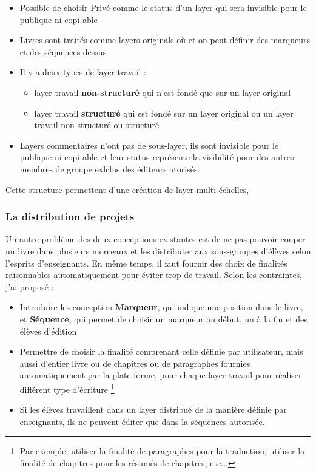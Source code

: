 \begin{itemize}
    \item Possible de choisir Privé comme le status d'un layer qui sera invisible pour le publique ni copi-able
    \item Livres sont traités comme layers originals où et on peut définir des marqueurs et des séquences dessus
    \item Il y a deux types de layer travail :
        \begin{itemize}
            \item layer travail \textbf{non-structuré} qui n'est fondé que sur un layer original
            \item layer travail \textbf{structuré} qui est fondé sur un layer original ou un layer travail non-structuré ou structuré
        \end{itemize}
    \item Layers commentaires n'ont pas de sous-layer, ils sont invisible pour le publique ni copi-able et leur status représente la visibilité pour des autres membres de groupe exlclus des éditeurs atorisés.
\end{itemize}

Cette structure permettent d'une création de layer multi-échelles,

\subsubsection{La distribution de projets}
Un autre problème des deux conceptions existantes est de ne pas pouvoir couper un livre dans plusieurs morceaux et les distributer aux sous-groupes d'élèves selon l'esprits d'enseignants. En même temps, il faut fournir des choix de finalités raisonnables automatiquement pour éviter trop de travail. Selon les contraintes, j'ai proposé :

\begin{itemize}
    \item Introduire les conception \textbf{Marqueur}, qui indique une position dans le livre, et \textbf{Séquence}, qui permet de choisir un marqueur au début, un à la fin et des élèves d'édition
    \item Permettre de choisir la finalité comprenant celle définie par utilisateur, mais aussi d'entier livre ou de chapitres ou de paragraphes fournies automatiquement par la plate-forme, pour chaque layer travail pour réaliser différent type d'écriture \footnote{ Par exemple, utiliser la finalité de paragraphes pour la traduction, utiliser la finalité de chapitres pour les résumés de chapitres, etc...} 
    \item Si les élèves travaillent dans un layer distribué de la manière définie par enseignants, ils ne peuvent éditer que dans la séquences autorisée.
\end{itemize}

